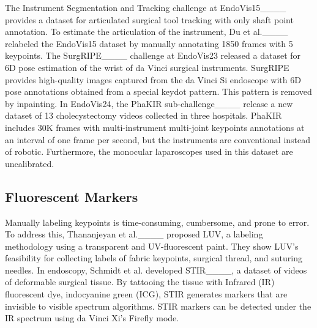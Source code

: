 The Instrument Segmentation and Tracking challenge at EndoVis15____ provides a dataset for articulated surgical tool tracking with only shaft point annotation.  To estimate the articulation of the instrument, Du et al.____ relabeled the EndoVis15 dataset by manually annotating 1850 frames with 5 keypoints. The SurgRIPE____ challenge at EndoVis23 released a dataset for 6D pose estimation of the wrist of da Vinci surgical instruments. SurgRIPE provides high-quality images captured from the da Vinci Si endoscope with 6D pose annotations obtained from a special keydot pattern. This pattern is removed by inpainting. In EndoVis24, the PhaKIR sub-challenge____ release a new dataset of 13 cholecystectomy videos collected in three hospitals. PhaKIR includes 30K frames with multi-instrument multi-joint keypoints annotations at an interval of one frame per second, but the instruments are conventional instead of robotic. Furthermore, the monocular laparoscopes used in this dataset are uncalibrated. 

\subsection{Fluorescent Markers}
Manually labeling keypoints is time-consuming, cumbersome, and prone to error. To address this, Thananjeyan et al.____ proposed LUV, a labeling methodology using a transparent and UV-fluorescent paint. They show LUV's feasibility for collecting labels of fabric keypoints, surgical thread, and suturing needles. In endoscopy, Schmidt et al. developed STIR____, a dataset of videos of deformable surgical tissue. By tattooing the tissue with Infrared (IR) fluorescent dye, indocyanine green (ICG), STIR generates markers that are invisible to visible spectrum algorithms. STIR markers can be detected under the IR spectrum using da Vinci Xi's Firefly mode.